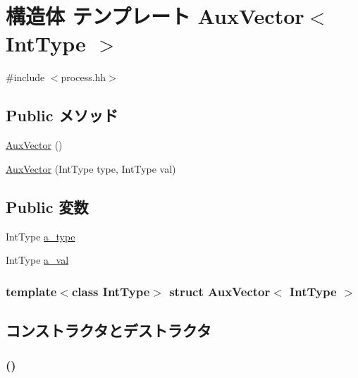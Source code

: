 \hypertarget{structAuxVector}{
\section{構造体 テンプレート AuxVector$<$ IntType $>$}
\label{structAuxVector}
}


{\ttfamily \#include $<$process.hh$>$}\subsection*{Public メソッド}
\begin{DoxyCompactItemize}
\item 
\hyperlink{structAuxVector_af1cd9c349ae0b291d98048cb753dbfcc}{AuxVector} ()
\item 
\hyperlink{structAuxVector_ad823c76cc9104660814ba71a8ce43db1}{AuxVector} (IntType type, IntType val)
\end{DoxyCompactItemize}
\subsection*{Public 変数}
\begin{DoxyCompactItemize}
\item 
IntType \hyperlink{structAuxVector_a4b056bc811e2d0991534ddd1c5f34331}{a\_\-type}
\item 
IntType \hyperlink{structAuxVector_a107121929143b17dedbc4fb74a7af245}{a\_\-val}
\end{DoxyCompactItemize}
\subsubsection*{template$<$class IntType$>$ struct AuxVector$<$ IntType $>$}



\subsection{コンストラクタとデストラクタ}
\hypertarget{structAuxVector_af1cd9c349ae0b291d98048cb753dbfcc}{
\subsubsection[{AuxVector}]{ ()}}
\label{structAuxVector_af1cd9c349ae0b291d98048cb753dbfcc}



